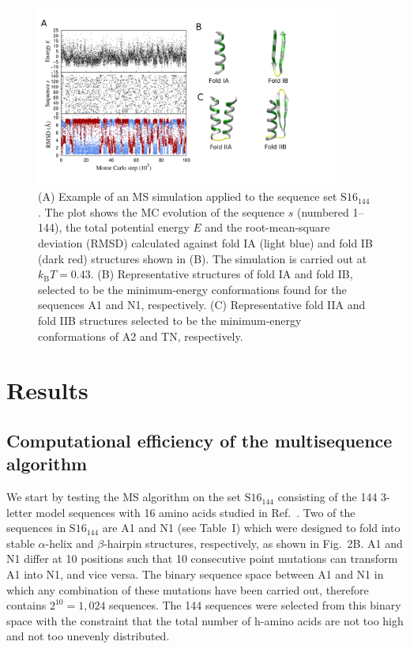 \documentclass[
aip,
rsi,%
amsmath,amssymb,
reprint,%
]{revtex4-1}
\newcommand	 {\sbar}	{{s}}
\newcommand	 {\kb}		{{k_\mathrm{B}}}
\newcommand {\SR}		{${\mathrm{S16}_{144}}$}
\begin{document}
\begin{figure}
\includegraphics[width=10.0cm]{MCTrajFolds}
\caption{(A) Example of an MS simulation applied to the sequence set $\mathrm{S16}_{144}$. The plot shows the MC evolution of the sequence $\sbar$ (numbered 1--144), the total potential energy $E$ and the root-mean-square deviation (RMSD) calculated against fold IA (light blue) and fold IB (dark red) structures shown in (B). The simulation is carried out at $\kb T = 0.43$. (B) Representative structures of fold IA and fold IB, selected to be the minimum-energy conformations found for the sequences A1 and N1, respectively. (C) Representative fold IIA and fold IIB structures selected to be the minimum-energy conformations of A2 and TN, respectively. }
\end{figure}

\section{Results}

\subsection{Computational efficiency of the multisequence algorithm}
\noindent
We start by testing the MS algorithm on the set {\SR} consisting of the 144 3-letter model sequences with 16 amino acids studied in Ref.~. Two of the sequences in {\SR} are A1 and N1 (see Table~I) which were designed to fold into stable $\alpha$-helix and $\beta$-hairpin structures, respectively, as shown in Fig.~2B. A1 and N1 differ at 10 positions such that 10 consecutive point mutations can transform A1 into N1, and vice versa. The binary sequence space between A1 and N1 in which any combination of these mutations have been carried out, therefore contains $2^{10}=1,024$ sequences. The 144 sequences were selected from this binary space with the constraint that the total number of h-amino acids are not too high and not too unevenly distributed.~\cite{Holzgrafe2014}
\end{document}
